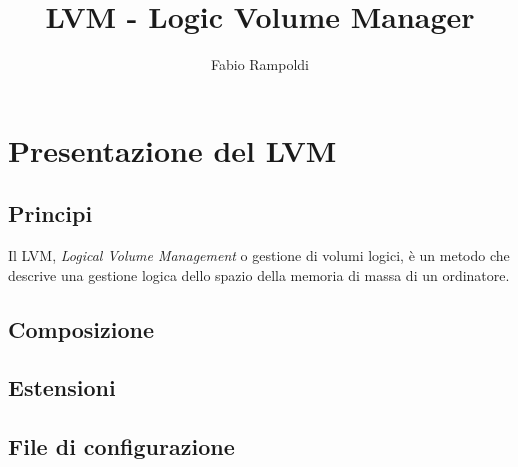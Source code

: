 \documentclass[a4paper,12pt]{article}
\title{LVM - Logic Volume Manager}
\author{Fabio Rampoldi}
\begin{document}
\maketitle
\pagebreak 
\tableofcontents
\pagebreak 

\section{Presentazione del LVM}
\subsection{Principi}
Il LVM, \textit{Logical Volume Management} o gestione di volumi logici, è un metodo che descrive una gestione logica dello spazio della memoria di massa di un ordinatore.
\subsection{Composizione}
\subsection{Estensioni}
\subsection{File di configurazione}
\end{document}
